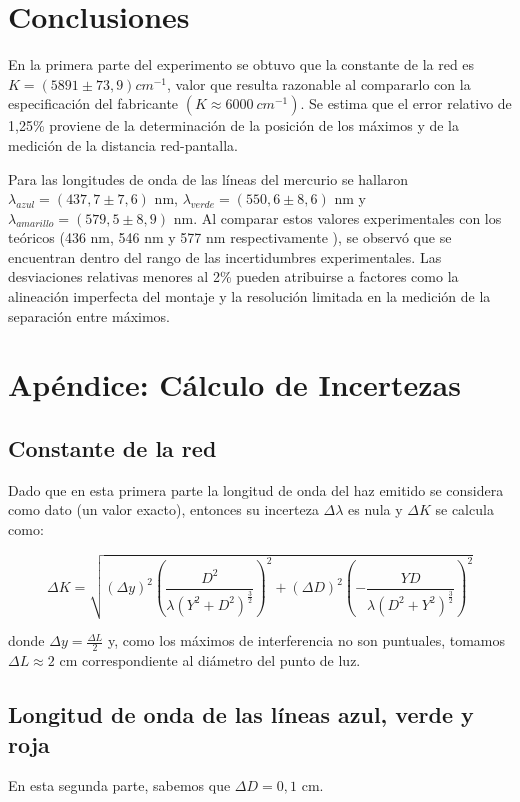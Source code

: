 \documentclass[12pt, a4paper]{article}
\begin{document}
\section{Conclusiones}

En la primera parte del experimento se obtuvo que la constante de la red es  $K = (5891 \pm 73,9) cm^{-1}$, valor que resulta razonable al 
compararlo con la especificación del fabricante $(K\approx6000\ cm^{-1})$. Se estima que el error relativo de 1,25\% proviene de la 
determinación de la posición de los máximos y de la medición de la distancia red-pantalla.

Para las longitudes de onda de las líneas del mercurio se hallaron $\lambda_{azul} = (437,7 \pm 7,6)$ nm, 
$\lambda_{verde} = (550,6 \pm 8,6)$ nm y $\lambda_{amarillo} = (579,5 \pm 8,9)$ nm. Al comparar estos valores experimentales con los teóricos 
(436 nm, 546 nm y 577 nm respectivamente \cite{uiowa_mercury}), se observó que se encuentran dentro del rango de las incertidumbres 
experimentales. Las desviaciones relativas menores al 2\% pueden atribuirse a factores como la alineación imperfecta del montaje y la 
resolución limitada en la medición de la separación entre máximos.


\section{Apéndice: Cálculo de Incertezas}

\subsection{Constante de la red}
Dado que en esta primera parte la longitud de onda del haz emitido se considera como dato (un valor exacto), entonces su incerteza 
$\Delta \lambda$ es nula y ${\Delta}K$ se calcula como:

\begin{equation}
  {\Delta}K = \sqrt{({\Delta}y)^2(\frac{D^{2}}{{\lambda} \left(Y^{2} + D^{2}\right)^{\frac{3}{2}}})^2+({\Delta}D)^2(-\frac{YD}
  {{\lambda} \left(D^{2} + Y^{2}\right)^{\frac{3}{2}}})^2}
\label{equation3}
\end{equation}

donde $\Delta y = \frac{\Delta L}{2}$ y, como los máximos de interferencia no son puntuales, tomamos $\Delta L \approx 2$ cm correspondiente
al diámetro del punto de luz.

\subsection{Longitud de onda de las líneas azul, verde y roja}
En esta segunda parte, sabemos que $\Delta D = 0,1$ cm.
\end{document}
